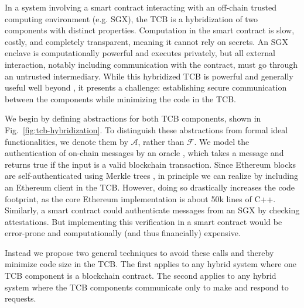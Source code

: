 In a system involving a smart contract interacting with an off-chain trusted computing environment (e.g. SGX),
the TCB is a hybridization of two components with distinct properties.
Computation in the smart contract is slow, costly, and completely transparent, meaning it cannot rely on secrets.
An SGX enclave is computationally powerful and executes privately, but all external interaction, notably including communication with the contract, must go through an untrusted intermediary. While this hybridized TCB is powerful and generally useful well beyond \tc, it presents a challenge: establishing secure communication between the components while minimizing the code in the TCB.


We begin by defining abstractions for both TCB components, shown in Fig.~\ref{fig:tcb-hybridization}. To distinguish these abstractions from formal ideal functionalities, we denote them by $\mathcal{A}$, rather than $\mathcal{F}$.
We model the authentication of on-chain messages by an oracle \oauth, which takes a message and returns true if the input is a valid blockchain transaction.
Since Ethereum blocks are self-authenticated using Merkle trees \cite{whitepaper,yellowpaper},
in principle we can realize \oauth by including an Ethereum client in the TCB.
However, doing so drastically increases the code footprint, as the core Ethereum implementation is about 50k lines of C++.
Similarly, a smart contract could authenticate messages from an SGX by checking attestations.
But implementing this verification in a smart contract would be error-prone and computationally (and thus financially) expensive.

Instead we propose two general techniques to avoid these calls and thereby minimize code size in the TCB.
The first applies to any hybrid system where one TCB component is a blockchain contract.
The second applies to any hybrid system where the TCB components communicate only to make and respond to requests.

